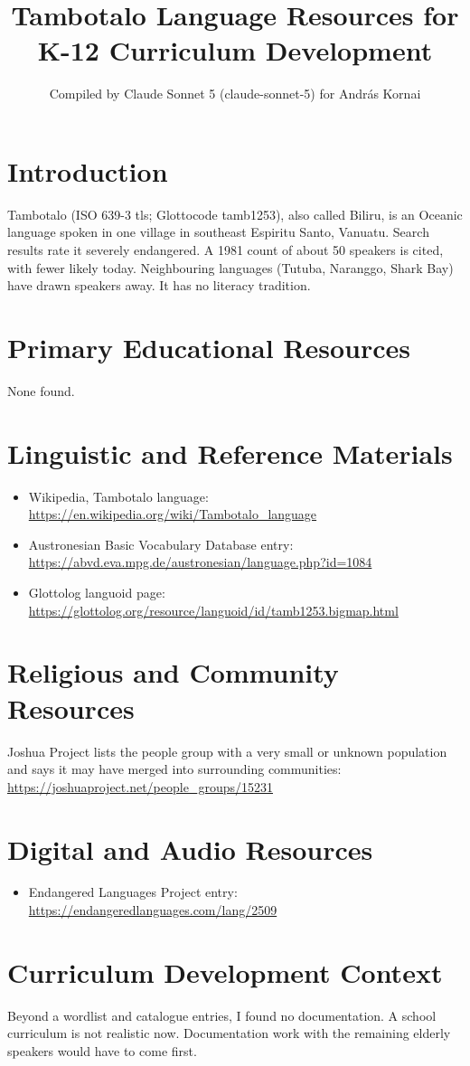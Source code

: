 \documentclass[12pt]{article}
\title{Tambotalo Language Resources for K-12 Curriculum Development}
\author{Compiled by Claude Sonnet 5 (claude-sonnet-5) for Andr\'as Kornai}
\date{}
\begin{document}
\maketitle

\section{Introduction}
Tambotalo (ISO 639-3 tls; Glottocode tamb1253), also called Biliru, is an Oceanic language spoken in one village in southeast Espiritu Santo, Vanuatu. Search results rate it severely endangered. A 1981 count of about 50 speakers is cited, with fewer likely today. Neighbouring languages (Tutuba, Naranggo, Shark Bay) have drawn speakers away. It has no literacy tradition.

\section{Primary Educational Resources}
None found.

\section{Linguistic and Reference Materials}
\begin{itemize}
\item Wikipedia, Tambotalo language: \url{https://en.wikipedia.org/wiki/Tambotalo_language}
\item Austronesian Basic Vocabulary Database entry: \url{https://abvd.eva.mpg.de/austronesian/language.php?id=1084}
\item Glottolog languoid page: \url{https://glottolog.org/resource/languoid/id/tamb1253.bigmap.html}
\end{itemize}

\section{Religious and Community Resources}
Joshua Project lists the people group with a very small or unknown population and says it may have merged into surrounding communities: \url{https://joshuaproject.net/people_groups/15231}

\section{Digital and Audio Resources}
\begin{itemize}
\item Endangered Languages Project entry: \url{https://endangeredlanguages.com/lang/2509}
\end{itemize}

\section{Curriculum Development Context}
Beyond a wordlist and catalogue entries, I found no documentation. A school curriculum is not realistic now. Documentation work with the remaining elderly speakers would have to come first.
\end{document}
